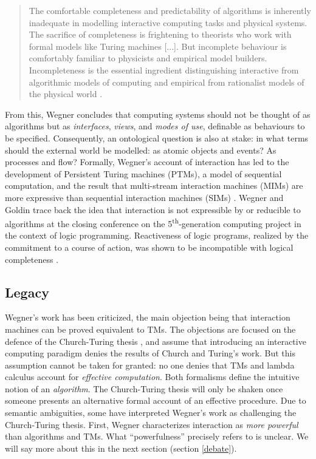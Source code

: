 \documentclass[a4paper, 11pt, twoside]{article}
\begin{document}
\begin{quote}
The comfortable completeness and predictability of algorithms is inherently inadequate in modelling interactive computing tasks and physical systems. The sacrifice of completeness is frightening to theorists who work with formal models like Turing machines [...]. But incomplete behaviour is comfortably familiar to physicists and empirical model builders. Incompleteness is the essential ingredient distinguishing interactive from algorithmic models of computing and empirical from rationalist models of the physical world \parencite{Wegner1997}.
\end{quote}

From this, Wegner concludes that computing systems should not be thought of as algorithms but as \textit{interfaces}, \textit{views}, and \textit{modes of use}, definable as behaviours to be specified. Consequently, an ontological question is also at stake: in what terms should the external world be modelled: as atomic objects and events? As processes and flow?
Formally, Wegner’s account of interaction has led to the development of Persistent Turing machines (PTMs), a model of sequential computation, and the result that multi-stream interaction machines (MIMs) are more expressive than sequential interaction machines (SIMs) \parencite{Goldin2000, Goldin2004}. Wegner and Goldin trace back the idea that interaction is not expressible by or reducible to algorithms at the closing conference on the 5\textsuperscript{th}-generation computing project in the context of logic programming. Reactiveness of logic programs, realized by the commitment to a course of action, was shown to be incompatible with logical completeness \parencite{Wegner1999}.

\subsection{Legacy}

Wegner's work has been criticized, the main objection being that interaction machines can be proved equivalent to TMs. The objections are focused on the defence of the Church-Turing thesis \parencite{Cockshott2007, Prasse1998}, and assume that introducing an interactive computing paradigm denies the results of Church and Turing's work. But this assumption cannot be taken for granted: no one denies that TMs and lambda calculus account for \textit{effective computation}. Both formalisms define the intuitive notion of an \textit{algorithm}. The Church-Turing thesis will only be shaken once someone presents an alternative formal account of an effective procedure. Due to semantic ambiguities, some have interpreted Wegner's work as challenging the Church-Turing thesis. First, Wegner characterizes interaction as \textit{more powerful} than algorithms and TMs. What ``powerfulness'' precisely refers to is unclear. We will say more about this in the next section (section \ref{debate}).
\end{document}
